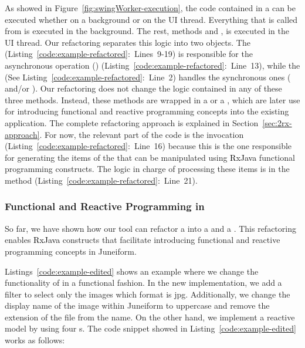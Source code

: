 \documentclass[type=bsc,accentcolor=tud9c]{tudthesis}
\newcommand{\framework}[1]{\textcolor{black}{#1}}
\begin{document}
As showed in Figure~\ref{fig:swingWorker-execution}, the code contained in a  can be executed whether on a background or on the UI thread. Everything that is called from  is executed in the background. The rest, methods  and , is executed in the UI thread. Our refactoring separates this logic into two objects. The  (Listing~\ref{code:example-refactored}:~Lines~9-19) is responsible for the asynchronous operation () (Listing~\ref{code:example-refactored}:~Line~13), while the  (See Listing~\ref{code:example-refactored}:~Line~2) handles the synchronous ones ( and/or ). Our refactoring does not change the logic contained in any of these three methods. Instead, these methods are wrapped in a  or a , which are later use for introducing functional and reactive programming concepts into the existing application. The complete refactoring approach is explained in Section~\ref{sec:2rx-approach}. For now, the relevant part of the code is the  invocation (Listing~\ref{code:example-refactored}:~Line~16) because this is the one responsible for generating the items of the  that can be manipulated using \framework{RxJava} functional programming constructs. The logic in charge of processing these items is in the method  (Listing~\ref{code:example-refactored}:~Line~21).

\subsubsection{Functional and Reactive Programming in }

So far, we have shown how our tool can refactor a  into a  and a . This refactoring enables \framework{RxJava} constructs that facilitate introducing functional and reactive programming concepts in Juneiform. 



Listings~\ref{code:example-edited} shows an example where we change the functionality of  in a functional fashion. In the new implementation, we add a filter to select only the images which format is jpg. Additionally, we change the display name of the image within Juneiform to uppercase and remove the extension of the file from the name. On the other hand, we implement a reactive model by using four s. The code snippet showed in Listing~\ref{code:example-edited} works as follows:
\end{document}
